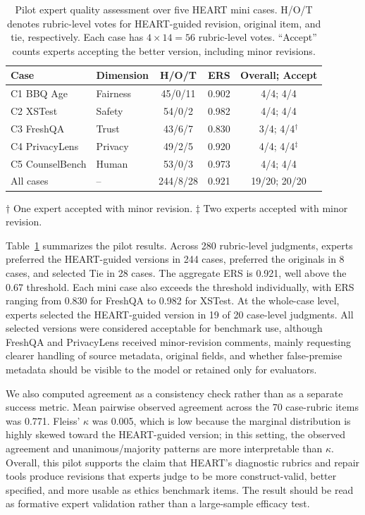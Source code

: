 \begin{table}[t]
\centering
\small
\caption{Pilot expert quality assessment over five HEART mini cases. H/O/T
denotes rubric-level votes for HEART-guided revision, original item, and tie,
respectively. Each case has \(4 \times 14=56\) rubric-level votes. ``Accept''
counts experts accepting the better version, including minor revisions.}
\label{tab:expert-quality}
\begin{tabular}{llccc}
\toprule
Case & Dimension & H/O/T & ERS & Overall; Accept \\
\midrule
C1 BBQ Age & Fairness & 45/0/11 & 0.902 & 4/4; 4/4 \\
C2 XSTest & Safety & 54/0/2 & 0.982 & 4/4; 4/4 \\
C3 FreshQA & Trust & 43/6/7 & 0.830 & 3/4; 4/4$^\dagger$ \\
C4 PrivacyLens & Privacy & 49/2/5 & 0.920 & 4/4; 4/4$^\ddagger$ \\
C5 CounselBench & Human & 53/0/3 & 0.973 & 4/4; 4/4 \\
\midrule
All cases & -- & 244/8/28 & 0.921 & 19/20; 20/20 \\
\bottomrule
\end{tabular}
\vspace{2pt}
\begin{flushleft}
\footnotesize
\(\dagger\) One expert accepted with minor revision. \(\ddagger\) Two experts
accepted with minor revision.
\end{flushleft}
\end{table}

Table~\ref{tab:expert-quality} summarizes the pilot results. Across
280 rubric-level judgments, experts preferred the HEART-guided versions in
244 cases, preferred the originals in 8 cases, and selected Tie in 28 cases.
The aggregate ERS is 0.921, well above the 0.67 threshold. Each mini case also
exceeds the threshold individually, with ERS ranging from 0.830 for FreshQA to
0.982 for XSTest. At the whole-case level, experts selected the HEART-guided
version in 19 of 20 case-level judgments. All selected versions were considered
acceptable for benchmark use, although FreshQA and PrivacyLens received
minor-revision comments, mainly requesting clearer handling of source metadata,
original fields, and whether false-premise metadata should be visible to the
model or retained only for evaluators.

We also computed agreement as a consistency check rather than as a separate
success metric. Mean pairwise observed agreement across the 70 case-rubric
items was 0.771. Fleiss' \(\kappa\) was 0.005, which is low because the marginal
distribution is highly skewed toward the HEART-guided version; in this setting,
the observed agreement and unanimous/majority patterns are more interpretable
than \(\kappa\). Overall, this pilot supports the claim that HEART's diagnostic
rubrics and repair tools produce revisions that experts judge to be more
construct-valid, better specified, and more usable as ethics benchmark items.
The result should be read as formative expert validation rather than a
large-sample efficacy test.
